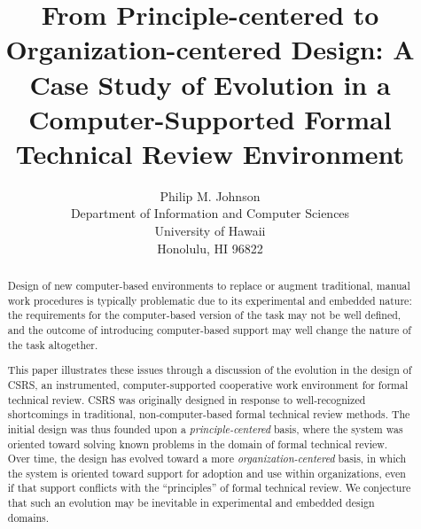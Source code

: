 

                


\title{From Principle-centered to Organization-centered Design:
       A Case Study of Evolution in a Computer-Supported Formal Technical 
       Review Environment}
\author{Philip M. Johnson\\
        Department of Information and Computer Sciences\\
        University of Hawaii\\
        Honolulu, HI 96822}

\maketitle

\begin{abstract}
  Design of new computer-based environments to replace or augment
  traditional, manual work procedures is typically problematic due to
  its experimental and embedded nature: the requirements for the
  computer-based version of the task may not be well defined, and the
  outcome of introducing computer-based support may well change the
  nature of the task altogether.
   
  This paper illustrates these issues through a discussion of the
  evolution in the design of CSRS, an instrumented, computer-supported
  cooperative work environment for formal technical review.  CSRS was
  originally designed in response to well-recognized shortcomings in
  traditional, non-computer-based formal technical review methods.  The
  initial design was thus founded upon a {\em principle-centered} basis,
  where the system was oriented toward solving known problems in the
  domain of formal technical review.  Over time, the design has evolved
  toward a more {\em organization-centered} basis, in which the system is
  oriented toward support for adoption and use within organizations, even
  if that support conflicts with the ``principles'' of formal technical
  review.  We conjecture that such an evolution may be inevitable in
  experimental and embedded design domains. 

\end{abstract}


